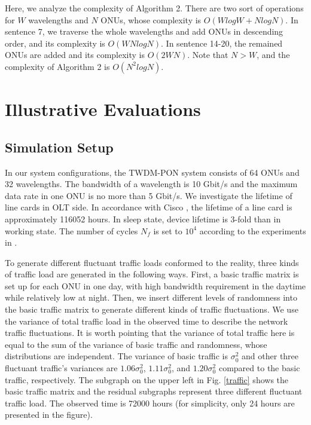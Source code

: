 \documentclass[letter]{IEEEtran}
\begin{document}
\vspace{-3.0mm}
Here, we analyze the complexity of Algorithm 2. There are two sort of operations for $W$ wavelengths and $N$ ONUs, whose complexity is $O(WlogW + NlogN)$. In sentence 7, we traverse the whole wavelengths and add ONUs in descending order, and its complexity is $O(WNlogN)$. In sentence 14-20, the remained ONUs are added and its complexity is $O(2WN)$. Note that $N > W$, and the complexity of Algorithm 2 is $O(N^2logN)$.
\vspace{-4.0mm}

\section{Illustrative Evaluations}
\subsection{Simulation Setup}
In our system configurations, the TWDM-PON system consists of 64 ONUs and 32 wavelengths. The bandwidth of a wavelength is 10 Gbit/s and the maximum data rate in one ONU is no more than 5 Gbit/s. We investigate the lifetime of line cards in OLT side. In accordance with Cisco \cite{cisco}, the lifetime of a line card is approximately 116052 hours. In sleep state, device lifetime is 3-fold than in working state. The number of cycles $ N_{f} $ is set to $ 10^{4}$ according to the experiments in \cite{toshiba}\cite{ghaffarian2000accelerated}. 

To generate different fluctuant traffic loads conformed to the reality, three kinds of traffic load are generated in the following ways. First, a basic traffic matrix is set up for each ONU in one day, with high bandwidth requirement in the daytime while relatively low at night. Then, we insert different levels of randomness into the basic traffic matrix to generate different kinds of traffic fluctuations. We use the variance of total traffic load in the observed time to describe the network traffic fluctuations. It is worth pointing that the variance of total traffic here is equal to the sum of the variance of basic traffic and randomness, whose distributions are independent. The variance of basic traffic is $ \sigma_{0}^{2} $ and other three fluctuant traffic's variances are $ 1.06\sigma_{0}^{2} $,  $ 1.11\sigma_{0}^{2} $, and  $ 1.20\sigma_{0}^{2} $ compared to the basic traffic, respectively. The subgraph on the upper left in Fig. \ref{traffic} shows the basic traffic matrix and the residual subgraphs represent three different fluctuant traffic load. The observed time is 72000 hours (for simplicity, only 24 hours are presented in the figure).
\end{document}
